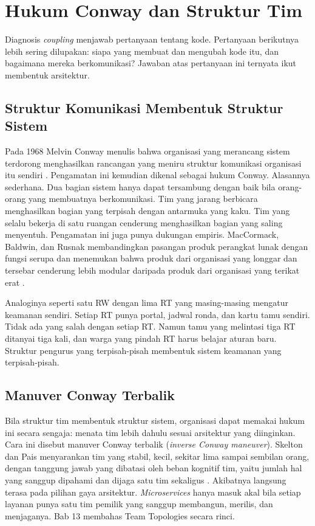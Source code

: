 \section{Hukum Conway dan Struktur Tim}
\label{sec:ch07-conway}

Diagnosis \textit{coupling} menjawab pertanyaan tentang kode. Pertanyaan berikutnya lebih sering
dilupakan: siapa yang membuat dan mengubah kode itu, dan bagaimana mereka berkomunikasi? Jawaban atas
pertanyaan ini ternyata ikut membentuk arsitektur.

\subsection{Struktur Komunikasi Membentuk Struktur Sistem}

Pada 1968 Melvin Conway menulis bahwa organisasi yang merancang sistem terdorong menghasilkan
rancangan yang meniru struktur komunikasi organisasi itu sendiri \cite{conway1968}. Pengamatan
ini kemudian dikenal sebagai hukum Conway. Alasannya sederhana. Dua bagian sistem hanya dapat
tersambung dengan baik bila orang-orang yang membuatnya berkomunikasi. Tim yang jarang berbicara
menghasilkan bagian yang terpisah dengan antarmuka yang kaku. Tim yang selalu bekerja di satu
ruangan cenderung menghasilkan bagian yang saling menyentuh. Pengamatan ini juga punya dukungan
empiris. MacCormack, Baldwin, dan Rusnak membandingkan pasangan produk perangkat lunak dengan fungsi
serupa dan menemukan bahwa produk dari organisasi yang longgar dan tersebar cenderung lebih modular
daripada produk dari organisasi yang terikat erat \cite{c07-maccormack2012}.

Analoginya seperti satu RW dengan lima RT yang masing-masing mengatur keamanan sendiri. Setiap RT
punya portal, jadwal ronda, dan kartu tamu sendiri. Tidak ada yang salah dengan setiap RT. Namun
tamu yang melintasi tiga RT ditanyai tiga kali, dan warga yang pindah RT harus belajar aturan baru.
Struktur pengurus yang terpisah-pisah membentuk sistem keamanan yang terpisah-pisah.

\subsection{Manuver Conway Terbalik}

Bila struktur tim membentuk struktur sistem, organisasi dapat memakai hukum ini secara sengaja:
menata tim lebih dahulu sesuai arsitektur yang diinginkan. Cara ini disebut manuver Conway terbalik
(\textit{inverse Conway maneuver}). Skelton dan Pais menyarankan tim yang stabil, kecil, sekitar
lima sampai sembilan orang, dengan tanggung jawab yang dibatasi oleh beban kognitif tim, yaitu
jumlah hal yang sanggup dipahami dan dijaga satu tim sekaligus \cite{skelton2025}. Akibatnya
langsung terasa pada pilihan gaya arsitektur. \textit{Microservices} hanya masuk akal bila setiap
layanan punya satu tim pemilik yang sanggup membangun, merilis, dan menjaganya. Bab 13 membahas
Team Topologies secara rinci.

